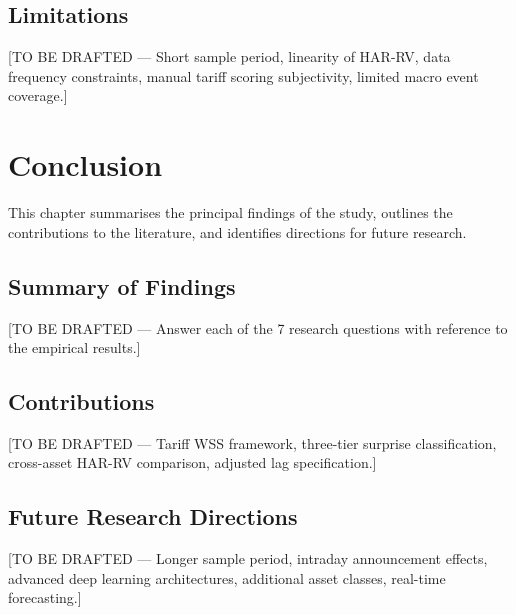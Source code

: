 \documentclass[12pt,a4paper]{report}
\begin{document}
\section{Limitations}
[TO BE DRAFTED --- Short sample period, linearity of HAR-RV, data frequency constraints, manual tariff scoring subjectivity, limited macro event coverage.]

\chapter{Conclusion}
This chapter summarises the principal findings of the study, outlines the contributions to the literature, and identifies directions for future research.

\section{Summary of Findings}
[TO BE DRAFTED --- Answer each of the 7 research questions with reference to the empirical results.]

\section{Contributions}
[TO BE DRAFTED --- Tariff WSS framework, three-tier surprise classification, cross-asset HAR-RV comparison, adjusted lag specification.]

\section{Future Research Directions}
[TO BE DRAFTED --- Longer sample period, intraday announcement effects, advanced deep learning architectures, additional asset classes, real-time forecasting.]

\nocite{*}



\appendix
\end{document}
